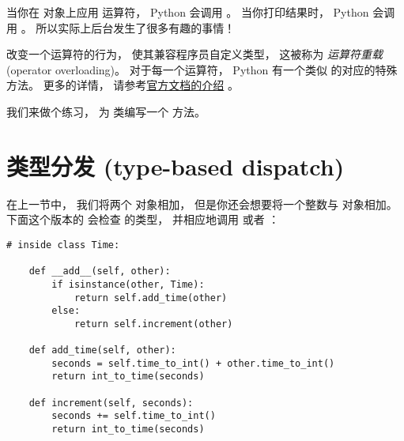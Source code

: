当你在  对象上应用 \li{+} 运算符， Python 会调用  。
当你打印结果时， Python 会调用  。
所以实际上后台发生了很多有趣的事情！



改变一个运算符的行为， 使其兼容程序员自定义类型， 这被称为
{\em 运算符重载} (operator overloading)。
对于每一个运算符， Python 有一个类似  的对应的特殊方法。
更多的详情， 请参考\href{http://docs.python.org/3/reference/datamodel.html#specialnames}{官方文档的介绍} 。


我们来做个练习， 为  类编写一个  方法。

\section{类型分发 (type-based dispatch)}


在上一节中， 我们将两个 对象相加，
但是你还会想要将一个整数与 对象相加。
下面这个版本的 会检查 的类型，
并相应地调用 或者 ：

\begin{lstlisting}
# inside class Time:

    def __add__(self, other):
        if isinstance(other, Time):
            return self.add_time(other)
        else:
            return self.increment(other)

    def add_time(self, other):
        seconds = self.time_to_int() + other.time_to_int()
        return int_to_time(seconds)

    def increment(self, seconds):
        seconds += self.time_to_int()
        return int_to_time(seconds)
\end{lstlisting}

